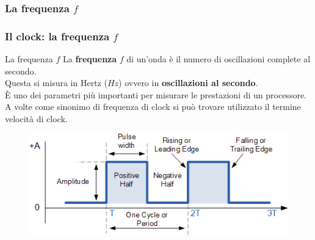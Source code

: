\subsubsection[La frequenza $f$]{La frequenza $f$}
\begin{frame}
	\frametitle{Il clock: la frequenza $f$}
	
	\begin{block}{La frequenza $f$}
		La \textbf{frequenza} $f$ di un'onda è il numero di oscillazioni complete al secondo.\\
		Questa si misura in Hertz ($Hz$) ovvero in \textbf{oscillazioni al secondo}.\\
		È uno dei parametri più importanti per misurare le prestazioni di un processore.\\
		A volte come sinonimo di frequenza di clock si può trovare utilizzato il termine velocità di clock.
	\end{block}
	
	
	\begin{figure}[!htbp]
		\centering 
		\includegraphics[width=0.78\linewidth]{images/2_elettronica/clock.png}
	\end{figure}
	
\end{frame}


